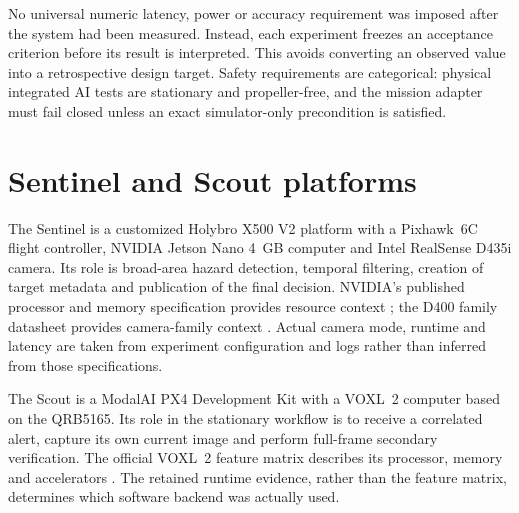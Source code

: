 No universal numeric latency, power or accuracy requirement was imposed after
the system had been measured. Instead, each experiment freezes an acceptance
criterion before its result is interpreted. This avoids converting an observed
value into a retrospective design target. Safety requirements are categorical:
physical integrated AI tests are stationary and propeller-free, and the
mission adapter must fail closed unless an exact simulator-only precondition is
satisfied.

\section{Sentinel and Scout platforms}
\label{sec:architecture:platforms}

The Sentinel is a customized Holybro X500 V2 platform with a Pixhawk~6C flight
controller, NVIDIA Jetson Nano 4~GB computer and Intel RealSense D435i camera.
Its role is broad-area hazard detection, temporal filtering, creation of target
metadata and publication of the final decision. NVIDIA's published processor
and memory specification provides resource context \cite{NvidiaJetsonNano};
the D400 family datasheet provides camera-family context
\cite{IntelD400Datasheet}. Actual camera mode, runtime and latency are taken
from experiment configuration and logs rather than inferred from those
specifications.

The Scout is a ModalAI PX4 Development Kit with a VOXL~2 computer based on the
QRB5165. Its role in the stationary workflow is to receive a correlated alert,
capture its own current image and perform full-frame secondary verification.
The official VOXL~2 feature matrix describes its processor, memory and
accelerators \cite{ModalAIVOXL2}. The retained runtime evidence, rather than
the feature matrix, determines which software backend was actually used.

